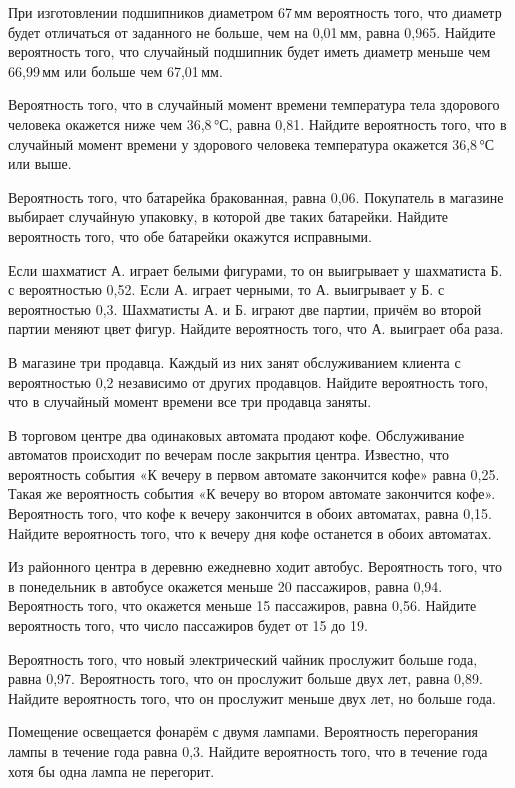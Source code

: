 \begin{listofex}
	\item При изготовлении подшипников диаметром 67 мм вероятность того, что диаметр будет отличаться от заданного не больше, чем на 0,01 мм, равна 0,965. Найдите вероятность того, что случайный подшипник будет иметь диаметр меньше чем 66,99 мм или больше чем 67,01 мм.
	\item Вероятность того, что в случайный момент времени температура тела здорового человека окажется ниже чем 36,8 °С, равна 0,81. Найдите вероятность того, что в случайный момент времени у здорового человека температура окажется 36,8 °С или выше.
	\item Вероятность того, что батарейка бракованная, равна 0,06. Покупатель в магазине выбирает случайную упаковку, в которой две таких батарейки. Найдите вероятность того, что обе батарейки окажутся исправными.
	\item Если шахматист А. играет белыми фигурами, то он выигрывает у шахматиста Б. с вероятностью 0,52. Если А. играет черными, то А. выигрывает у Б. с вероятностью 0,3. Шахматисты А. и Б. играют две партии, причём во второй партии меняют цвет фигур. Найдите вероятность того, что А. выиграет оба раза.
	\item В магазине три продавца. Каждый из них занят обслуживанием клиента с вероятностью 0,2 независимо от других продавцов. Найдите вероятность того, что в случайный момент времени все три продавца заняты.
	\item В торговом центре два одинаковых автомата продают кофе. Обслуживание автоматов происходит по вечерам после закрытия центра. Известно, что вероятность события «К вечеру в первом автомате закончится кофе» равна 0,25. Такая же вероятность события «К вечеру во втором автомате закончится кофе». Вероятность того, что кофе к вечеру закончится в обоих автоматах, равна 0,15. Найдите вероятность того, что к вечеру дня кофе останется в обоих автоматах.
	\item Из районного центра в деревню ежедневно ходит автобус. Вероятность того, что в понедельник в автобусе окажется меньше 20 пассажиров, равна 0,94. Вероятность того, что окажется меньше 15 пассажиров, равна 0,56. Найдите вероятность того, что число пассажиров будет от 15 до 19.
	\item Вероятность того, что новый электрический чайник прослужит больше года, равна 0,97. Вероятность того, что он прослужит больше двух лет, равна 0,89. Найдите вероятность того, что он прослужит меньше двух лет, но больше года.
	\item Помещение освещается фонарём с двумя лампами. Вероятность перегорания лампы в течение года равна 0,3. Найдите вероятность того, что в течение года хотя бы одна лампа не перегорит.

\end{listofex}
